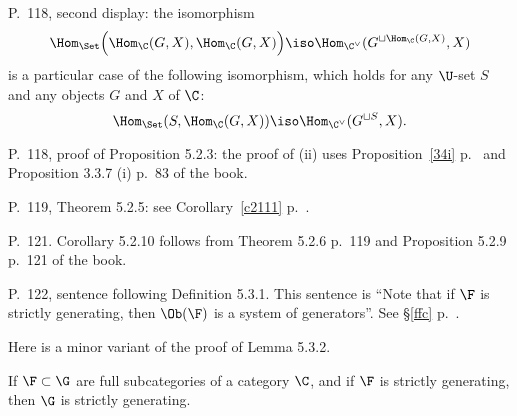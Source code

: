 \documentclass[12pt]{article}
\theoremstyle{remark}
\theoremstyle{definition}
\begin{document}
%

\begin{s}
P.~118, second display: the isomorphism 
$$
\Hom_{\Set}\Big(\Hom_\C(G,X),\Hom_\C(G,X)\Big)\iso\Hom_{\C^\vee}(G^{\sqcup\Hom_\C(G,X)},X)
$$ 
is a particular case of the following isomorphism, which holds for any $\U$-set $S$ and any objects $G$ and $X$ of $\C$: 
$$
\Hom_{\Set}(S,\Hom_\C(G,X))\iso\Hom_{\C^\vee}(G^{\sqcup S},X).
$$ 
\end{s}

%

\begin{s}
P.~118, proof of Proposition 5.2.3: the proof of (ii) uses Proposition~\ref{34i} p.~ and Proposition 3.3.7 (i) p.~83 of the book. 
\end{s} 

%

\begin{s}
P.~119, Theorem 5.2.5: see Corollary~\ref{c2111} p.~.
\end{s}

%

\begin{s}
P.~121. Corollary 5.2.10 follows from Theorem 5.2.6 p.~119 and Proposition 5.2.9 p.~121 of the book.
\end{s}

%

\begin{s}
P.~122, sentence following Definition 5.3.1. This sentence is ``Note that if $\F$ is strictly generating, then $\Ob(\F)$ is a system of generators''. See \S\ref{ffc} p.~. 
\end{s}  



Here is a minor variant of the proof of Lemma 5.3.2. 

\begin{lem}[Lemma 5.3.2 p.~122]
If $\F\subset\G$ are full subcategories of a category $\C$, and if $\F$ is strictly generating, then $\G$ is strictly generating. 
\end{lem} 
\end{document}
